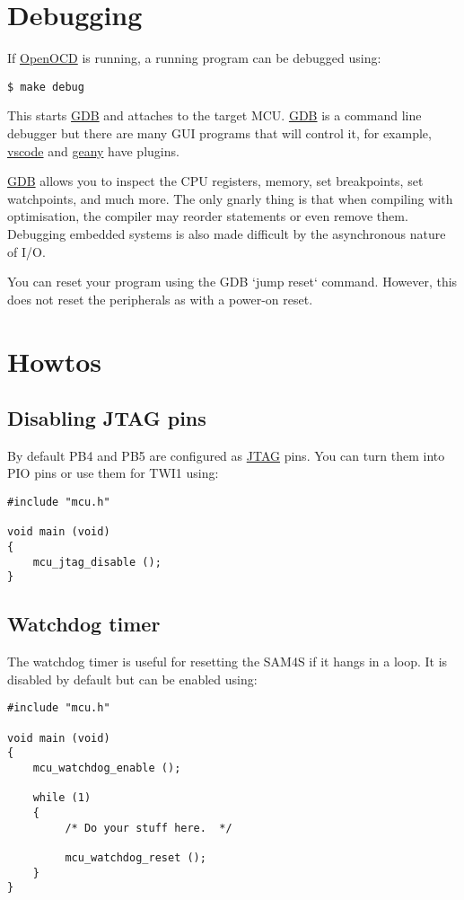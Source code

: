 \section{Debugging}
\label{debugging}

If \url{OpenOCD} is running, a running program can be debugged using:

\begin{verbatim}
$ make debug
\end{verbatim}

This starts \url{GDB} and attaches to the target MCU. \url{GDB} is a
command line debugger but there are many GUI programs that will control
it, for example, \url{vscode} and \url{geany} have plugins.

\url{GDB} allows you to inspect the CPU registers, memory, set
breakpoints, set watchpoints, and much more. The only gnarly thing is
that when compiling with optimisation, the compiler may reorder
statements or even remove them. Debugging embedded systems is also made
difficult by the asynchronous nature of I/O.

You can reset your program using the GDB `jump reset` command. However,
this does not reset the peripherals as with a power-on reset.

\section{Howtos}
\label{howtos}

\subsection{Disabling JTAG pins}
\label{disabling-jtag-pins}

By default PB4 and PB5 are configured as \url{JTAG} pins. You can turn
them into PIO pins or use them for TWI1 using:
%
\begin{verbatim}
#include "mcu.h"

void main (void)
{
    mcu_jtag_disable ();
}
\end{verbatim}

\subsection{Watchdog timer}
\label{watchdog-timer}

The watchdog timer is useful for resetting the SAM4S if it hangs in a
loop.  It is disabled by default but can be enabled using:
%
\begin{verbatim}
#include "mcu.h"

void main (void)
{
    mcu_watchdog_enable ();
   
    while (1)
    {
         /* Do your stuff here.  */

         mcu_watchdog_reset ();
    }
}
\end{verbatim}

